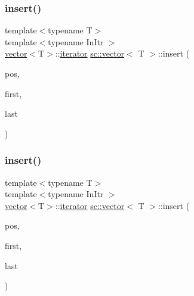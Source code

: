 \subsubsection{\texorpdfstring{insert()}{insert()}\hspace{0.1cm}{\footnotesize\ttfamily [6/9]}}
{\footnotesize\ttfamily template$<$typename T$>$ \\
template$<$typename In\+Itr $>$ \\
\mbox{\hyperlink{classsc_1_1vector}{vector}}$<$T$>$\+::\mbox{\hyperlink{classsc_1_1vector_1_1iterator}{iterator}} \mbox{\hyperlink{classsc_1_1vector}{sc\+::vector}}$<$ T $>$\+::insert (\begin{DoxyParamCaption}\item[{typename \mbox{\hyperlink{classsc_1_1vector}{vector}}$<$ T $>$\+::\mbox{\hyperlink{classsc_1_1vector_1_1iterator}{iterator}}}]{pos,  }\item[{In\+Itr}]{first,  }\item[{In\+Itr}]{last }\end{DoxyParamCaption})}

\mbox{\label{classsc_1_1vector_a774a81ea7131584862592c29a8137e28}} 
\subsubsection{\texorpdfstring{insert()}{insert()}\hspace{0.1cm}{\footnotesize\ttfamily [7/9]}}
{\footnotesize\ttfamily template$<$typename T$>$ \\
template$<$typename In\+Itr $>$ \\
\mbox{\hyperlink{classsc_1_1vector}{vector}}$<$T$>$\+::\mbox{\hyperlink{classsc_1_1vector_1_1iterator}{iterator}} \mbox{\hyperlink{classsc_1_1vector}{sc\+::vector}}$<$ T $>$\+::insert (\begin{DoxyParamCaption}\item[{typename \mbox{\hyperlink{classsc_1_1vector}{vector}}$<$ T $>$\+::\mbox{\hyperlink{classsc_1_1vector_1_1iterator}{iterator}}}]{pos,  }\item[{In\+Itr}]{first,  }\item[{In\+Itr}]{last }\end{DoxyParamCaption})}

\mbox{\label{classsc_1_1vector_a4e59b7f5bc99a5436397426626719251}} 
